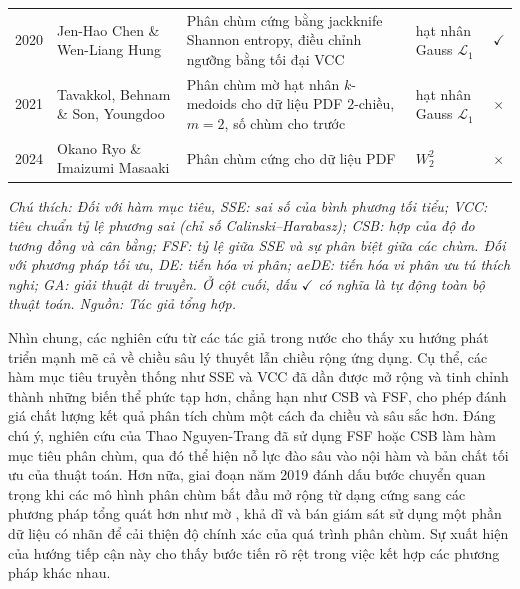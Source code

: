 \documentclass[a4paper,oneside]{book} %
\theoremstyle{plain}
\theoremstyle{plain}
\theoremstyle{nonumberplain}
\begin{document}
\begin{table}
\begin{tabular*}{\textwidth}{@{\extracolsep\fill}lp{3cm}p{5.5cm}p{3cm}p{2cm}@{\extracolsep\fill}}
		\midrule
				2020 & Jen-Hao Chen \& Wen-Liang Hung \cite{chen2021jackknife} & Phân chùm cứng bằng jackknife Shannon entropy, điều chỉnh ngưỡng bằng tối đại VCC& hạt nhân Gauss $\mathcal{L}_1$ & $\checkmark$\\
		2021 & Tavakkol, Behnam \& Son, Youngdoo \cite{tavakkol2021fuzzy} & Phân chùm mờ hạt nhân $k$-medoids cho dữ liệu PDF $2$-chiều, $m=2$, số chùm cho trước& hạt nhân Gauss $\mathcal{L}_1$& $\times$   \\
		2024 & Okano Ryo \& Imaizumi Masaaki \cite{okano2024wasserstein} & Phân chùm cứng cho dữ liệu PDF &$W^2_2$ &$\times$   \\
		\bottomrule
	\end{tabular*}
	\label{tab:in_clustering_summary}
\begin{minipage}{\textwidth}
			\fontsize{11pt}{14pt}\selectfont\it
	Chú thích:	Đối với hàm mục tiêu, SSE: sai số của bình phương tối tiểu; VCC: tiêu chuẩn tỷ lệ phương sai (chỉ số Calinski--Harabasz); CSB: hợp của độ đo tương đồng và cân bằng; FSF: tỷ lệ giữa SSE và sự phân biệt giữa các chùm. Đối với phương pháp tối ưu, DE:  tiến hóa vi phân; aeDE: tiến hóa vi phân ưu tú thích nghi; GA: giải thuật di truyền. Ở cột cuối, dấu $\checkmark$ có nghĩa là tự động toàn bộ thuật toán. Nguồn: Tác giả tổng hợp.
\end{minipage}
\end{table}

Nhìn chung, các nghiên cứu từ các tác giả trong nước cho thấy xu hướng phát triển mạnh mẽ cả về chiều sâu lý thuyết lẫn chiều rộng ứng dụng. Cụ thể, các hàm mục tiêu truyền thống như SSE và VCC đã dần được mở rộng và tinh chỉnh thành những biến thể phức tạp hơn, chẳng hạn như CSB và FSF, cho phép đánh giá chất lượng kết quả phân tích chùm một cách đa chiều và sâu sắc hơn. Đáng chú ý, nghiên cứu của Thao Nguyen-Trang đã sử dụng FSF \cite{nguyen2023globally} hoặc CSB \cite{nguyen2023balance} làm hàm mục tiêu phân chùm, qua đó thể hiện nỗ lực đào sâu vào nội hàm và bản chất tối ưu của thuật toán.
Hơn nữa, giai đoạn năm 2019 đánh dấu bước chuyển quan trọng khi các mô hình phân chùm bắt đầu mở rộng từ dạng cứng \cite{pham2019new} sang các phương pháp tổng quát hơn như mờ \cite{phamtoan2022automatic}, khả dĩ \cite{tran2024new} và bán giám sát \cite{nguyen2024new} sử dụng một phần dữ liệu có nhãn để cải thiện độ chính xác của quá trình phân chùm. Sự xuất hiện của hướng tiếp cận này cho thấy bước tiến rõ rệt trong việc kết hợp các phương pháp khác nhau.
\end{document}
